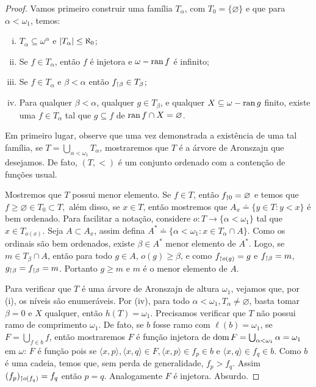 \documentclass[a4paper]{article}
\begin{document}
\begin{proof}
  Vamos primeiro construir uma família \(T_\alpha\), com \(T_0=\{\varnothing\}\)
  e que para \(\alpha <\omega_1\), temos:
  \begin{enumerate}[(i)]
    \item \(T_{\alpha} \subseteq \omega^{\alpha}\) e \(\vert T_{\alpha} \vert \le \aleph_0\);
    \item Se \(f \in T_{\alpha}\), então \(f\) é injetora e \(\omega - \operatorname{ran} f\) é infinito;
    \item Se \(f \in T_{\alpha}\) e \(\beta < \alpha\) então \(f_{\upharpoonright \beta} \in T_{\beta}\);
    \item Para qualquer \(\beta < \alpha\), qualquer \(g \in T_{\beta}\), e
    qualquer \(X \subseteq \omega - \operatorname{ran} g\) finito, existe uma \(f \in
    T_{\alpha}\) tal que \(g \subseteq f\) de \(\operatorname{ran} f \cap X = \varnothing\).
    \end{enumerate}

    Em primeiro lugar, observe que uma vez demonstrada a existência de uma tal família,
    se \(T=\bigcup_{\alpha<\omega_1} T_\alpha\), mostraremos que \(T\) é a árvore de Aronszajn que desejamos. De fato, \((T,<)\) é um conjunto ordenado com a contenção de funções usual.
    
    Mostremos que \(T\) possui menor elemento. Se \(f\in T\), então \(f_{\upharpoonright 0}=\varnothing\) e temos que \(f\geq\varnothing\in T_0\subset T,\) além disso, se \(x\in T\), então mostremos que \(A_x\doteq\{y\in T : y<x\}\) é bem ordenado. Para facilitar a notação, considere \(o\colon T\rightarrow \{\alpha<\omega_1\}\) tal que \(x\in T_{o(x)}\). Seja \(A\subset A_x\), assim defina \(A^*\doteq \{\alpha<\omega_1 : x\in T_\alpha\cap A\}\). Como os ordinais são bem ordenados, existe \(\beta\in A^*\) menor elemento de \(A^*\).
    Logo, se \(m\in T_\beta\cap A\), então para todo \(g\in A\), \(o(g)\geq\beta\), e como \(f_{\upharpoonright o(g)}=g\) e \(f_{\upharpoonright \beta}=m\), \(g_{\upharpoonright \beta}=f_{\upharpoonright \beta}=m\). Portanto \(g\geq m\) e \(m\) é o menor elemento de \(A\).
    
    Para verificar que \(T\) é uma árvore de Aronszajn de altura \(\omega_1\), vejamos que, por (i), os níveis são enumeráveis. Por (iv), para todo \(\alpha<\omega_1, T_\alpha\neq\varnothing\), basta tomar \(\beta=0\) e \(X\) qualquer, então \(h(T)=\omega_1\). Precisamos verificar que \(T\) não possui ramo de comprimento \(\omega_1\). De fato, se \(b\) fosse ramo com \(\ell(b)=\omega_1\), se \(F=\bigcup_{f\in b} f\), então mostraremos \(F\) é função injetora de \(\operatorname{dom} F=\bigcup_{\alpha<\omega_1}\alpha=\omega_1\) em \(\omega\): \(F\) é função pois se \(\langle x,p\rangle,\langle x,q\rangle\in F,  \langle x,p\rangle\in f_p\in b\) e \(\langle x,q\rangle\in f_q\in b\). Como \(b\) é uma cadeia, temos que, sem perda de generalidade, \(f_p>f_q\). Assim \((f_p)_{\upharpoonright o(f_q)}=f_q\) então \(p=q\). Analogamente \(F\) é injetora. Absurdo.
    

\end{proof}
\end{document}
